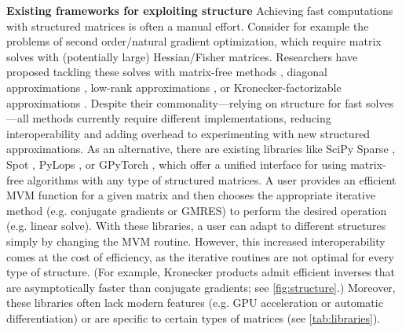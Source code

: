 \documentclass{article}
\begin{document}
\textbf{Existing frameworks for exploiting structure} \quad
Achieving fast computations with structured matrices is often a manual effort.
Consider for example the problems of second order/natural gradient optimization, which require matrix solves with (potentially large) Hessian/Fisher matrices.
Researchers have proposed tackling these solves with matrix-free methods \citep{martens2010deep}, diagonal approximations \citep[e.g.][]{becker1989improving}, low-rank approximations \citep[e.g.][]{roux2007topmoumoute}, or Kronecker-factorizable approximations \citep{martens2015optimizing}.
Despite their commonality---relying on structure for fast solves---all methods currently require different implementations,
reducing interoperability and adding overhead to experimenting with new structured approximations.
As an alternative, there are existing libraries like SciPy Sparse \citep{scipy}, Spot \citep{spot}, PyLops \citep{pylops}, or GPyTorch \citep{gardner2018gpytorch}, which offer a unified interface for using matrix-free algorithms with any type of structured matrices.
A user provides an efficient MVM function for a given matrix
and then chooses the appropriate iterative method (e.g. conjugate gradients or GMRES) to perform the desired operation (e.g. linear solve).
With these libraries, a user can adapt to different structures simply by changing the MVM routine. However, this increased interoperability comes at the cost of efficiency,
as the iterative routines are not optimal for every type of structure.
(For example, Kronecker products admit efficient inverses that are asymptotically faster than conjugate gradients; see \autoref{fig:structure}.)
Moreover, these libraries often lack modern features (e.g. GPU acceleration or automatic differentiation) or are specific to certain types of matrices (see \autoref{tab:libraries}).
\end{document}
